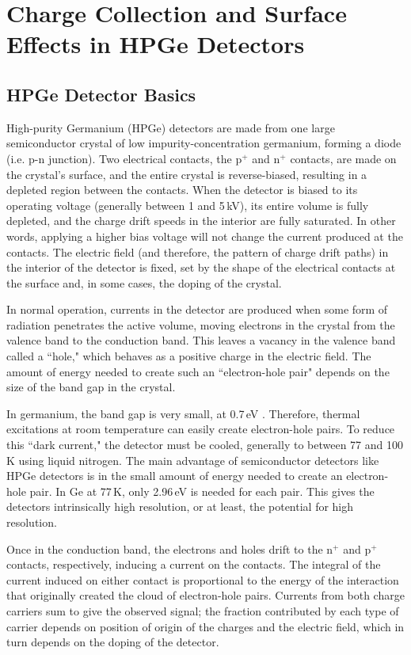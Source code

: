 
 
\chapter {Charge Collection and Surface Effects in HPGe Detectors}
\section{HPGe Detector Basics}
High-purity Germanium (HPGe) detectors are made from one large semiconductor crystal of low impurity-concentration germanium, forming a diode (i.e. p-n junction). Two electrical contacts, the p$^+$ and n$^+$ contacts, are made on the crystal's surface, and the entire crystal is reverse-biased, resulting in a depleted region between the contacts. When the detector is biased to its operating voltage (generally between 1 and 5\,kV), its entire volume is fully depleted, and the charge drift speeds in the interior are fully saturated. In other words, applying a higher bias voltage will not change the current produced at the contacts. The electric field (and therefore, the pattern of charge drift paths) in the interior of the detector is fixed, set by the shape of the electrical contacts at the surface and, in some cases, the doping of the crystal. 

In normal operation, currents in the detector are produced when some form of radiation penetrates the active volume, moving electrons in the crystal from the valence band to the conduction band. This leaves a vacancy in the valence band called a ``hole," which behaves as a positive charge in the electric field. The amount of energy needed to create such an ``electron-hole pair" depends on the size of the band gap in the crystal. 

In germanium, the band gap is very small, at 0.7\,eV \cite{Bertolini1968}. Therefore, thermal excitations at room temperature can easily create electron-hole pairs. To reduce this ``dark current," the detector must be cooled, generally to between 77 and 100\,K using liquid nitrogen. The main advantage of semiconductor detectors like HPGe detectors is in the small amount of energy needed to create an electron-hole pair. In Ge at 77\,K, only 2.96\,eV is needed for each pair. This gives the detectors intrinsically high resolution, or at least, the potential for high resolution. 

Once in the conduction band, the electrons and holes drift to the n$^+$ and p$^+$ contacts, respectively, inducing a current on the contacts. The integral of the current induced on either contact is proportional to the energy of the interaction that originally created the cloud of electron-hole pairs. Currents from both charge carriers sum to give the observed signal; the fraction contributed by each type of carrier depends on position of origin of the charges and the electric field, which in turn depends on the doping of the detector. 

